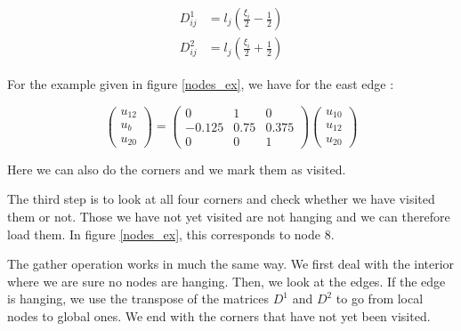 \begin{align*}
D^1_{ij} &= l_j\left(\frac{\xi_i}{2}-\frac{1}{2}\right)\\
D^2_{ij} &= l_j\left(\frac{\xi_i}{2}+\frac{1}{2}\right)
\end{align*}

For the example given in figure \ref{nodes_ex}, we have for the east edge :

$$ \begin{pmatrix}
u_{12} \\ u_b \\ u_{20}
\end{pmatrix} = \begin{pmatrix}
0 & 1 & 0\\
-0.125 & 0.75 & 0.375\\
0 & 0 & 1
\end{pmatrix}\begin{pmatrix}
u_{10} \\ u_{12} \\ u_{20}
\end{pmatrix}$$

Here we can also do the corners and we mark them as visited.

The third step is to look at all four corners and check whether we have visited them or not. Those we have not yet visited are not hanging and we can therefore load them. In figure \ref{nodes_ex}, this corresponds to node 8. 

The gather operation works in much the same way. We first deal with the interior where we are sure no nodes are hanging. Then, we look at the edges. If the edge is hanging, we use the transpose of the matrices $D^1$ and $D^2$ to go from local nodes to global ones. We end with the corners that have not yet been visited. 



